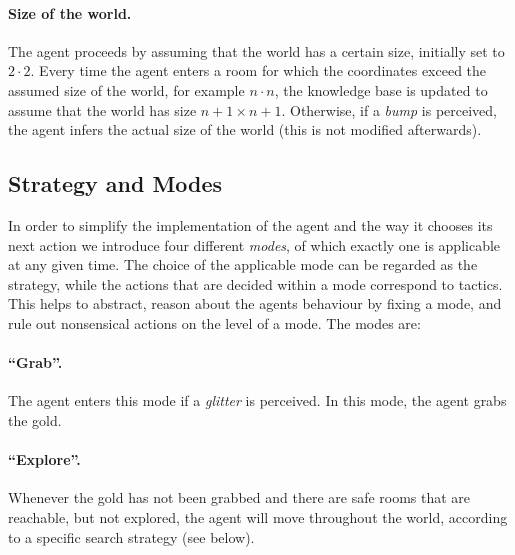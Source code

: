 \documentclass{llncs}
\begin{document}
\paragraph{Size of the world.} The agent proceeds by assuming that the world has a certain size, initially set to $2 \cdot 2$.
Every time the agent enters a room for which the coordinates exceed the assumed size of the world, for example $n \cdot n$, the knowledge base is updated to assume that the world has size $n+1 \times n+1$.
Otherwise, if a \emph{bump} is perceived, the agent infers the actual size of the world (this is not modified afterwards).

\subsection{Strategy and Modes}

In order to simplify the implementation of the agent and the way it chooses its next action we introduce four different \emph{modes}, of which exactly one is applicable at any given time.
The choice of the applicable mode can be regarded as the strategy, while the actions that are decided within a mode correspond to tactics.
This helps to abstract, reason about the agents behaviour by fixing a mode, and rule out nonsensical actions on the level of a mode. The modes are:

\paragraph{\enquote{Grab}.} The agent enters this mode if a \emph{glitter} is perceived. In this mode, the agent grabs the gold.

\paragraph{\enquote{Explore}.} Whenever the gold has not been grabbed and there are safe rooms that are reachable, but not explored, the agent will move throughout the world, according to a specific search strategy (see below).
\end{document}
